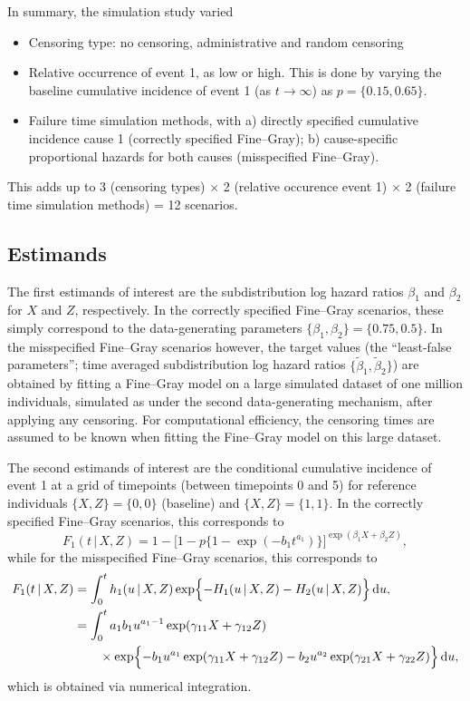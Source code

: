 \documentclass[
  letterpaper,
  DIV=11,
  numbers=noendperiod]{scrreprt}
\providecommand{\tightlist}{%
  \setlength{\itemsep}{0pt}\setlength{\parskip}{0pt}}\usepackage{longtable,booktabs,array}
\newcommand{\given}{\,|\,}
\newcommand\diff{\mathop{}\!\mathrm{d}}
\begin{document}
In summary, the simulation study varied

\begin{itemize}
\tightlist
\item
  Censoring type: no censoring, administrative and random censoring
\item
  Relative occurrence of event 1, as low or high. This is done by
  varying the baseline cumulative incidence of event 1 (as
  \(t \rightarrow \infty\)) as \(p = \{0.15, 0.65\}\).
\item
  Failure time simulation methods, with a) directly specified cumulative
  incidence cause 1 (correctly specified Fine--Gray); b) cause-specific
  proportional hazards for both causes (misspecified Fine--Gray).
\end{itemize}

This adds up to 3 (censoring types) \(\times\) 2 (relative occurence
event 1) \(\times\) 2 (failure time simulation methods) = 12 scenarios.

\hypertarget{estimands-1}{%
\subsection{Estimands}\label{estimands-1}}

The first estimands of interest are the subdistribution log hazard
ratios \(\beta_{1}\) and \(\beta_{2}\) for \(X\) and \(Z\),
respectively. In the correctly specified Fine--Gray scenarios, these
simply correspond to the data-generating parameters
\(\{\beta_{1},\beta_{2}\} = \{0.75, 0.5\}\). In the misspecified
Fine--Gray scenarios however, the target values (the ``least-false
parameters''; time averaged subdistribution log hazard ratios
\(\{\tilde{\beta}_{1},\tilde{\beta}_{2}\}\)) are obtained by fitting a
Fine--Gray model on a large simulated dataset of one million
individuals, simulated as under the second data-generating mechanism,
after applying any censoring. For computational efficiency, the
censoring times are assumed to be known when fitting the Fine--Gray
model on this large dataset.

The second estimands of interest are the conditional cumulative
incidence of event 1 at a grid of timepoints (between timepoints 0 and
5) for reference individuals \(\{X, Z\} = \{0,0\}\) (baseline) and
\(\{X, Z\} = \{1,1\}\). In the correctly specified Fine--Gray scenarios,
this corresponds to \begin{equation*}
    F_1(t \given X, Z) = 1 - \big[1-p\{1- \exp(-b_1t^{a_1})\}\big]^{\exp(\beta_{1}X + \beta_{2}Z)},
\end{equation*} while for the misspecified Fine--Gray scenarios, this
corresponds to \begin{align*}
    F_1(t \given X, Z) &= \int_{0}^{t}h_1(u \given X, Z) \exp\Bigl\{{ - H_1(u \given X, Z) - H_2(u \given X, Z) \Bigr\}}\diff u, \\
    &= \int_{0}^{t} a_1b_1u^{a_1 - 1}\exp(\gamma_{11}X + \gamma_{12}Z) \\
    &\qquad \times  \exp\Bigl\{{ -b_1u^{a_1}\exp(\gamma_{11}X + \gamma_{12}Z) - b_2u^{a_2}\exp(\gamma_{21}X + \gamma_{22}Z) \Bigr\}}\diff u,
\end{align*} which is obtained via numerical integration.
\end{document}
